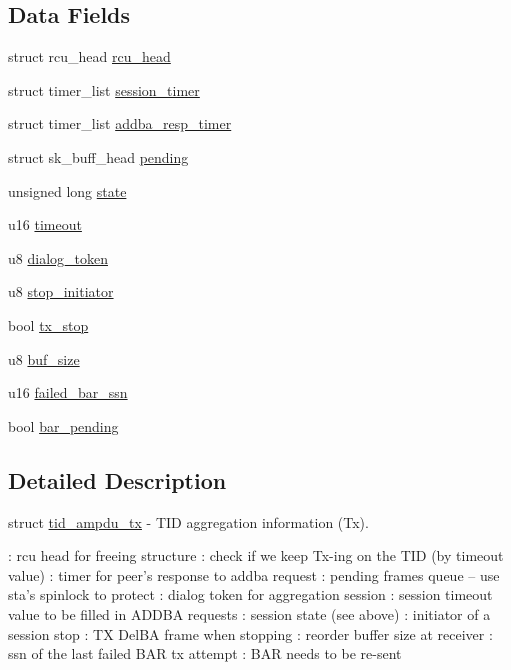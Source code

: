 \subsection*{Data Fields}
\begin{DoxyCompactItemize}
\item 
struct rcu\-\_\-head \hyperlink{structtid__ampdu__tx_ab698383409a24791490f962fe6990655}{rcu\-\_\-head}
\item 
struct timer\-\_\-list \hyperlink{structtid__ampdu__tx_a96b57b74220e5b5898ffd791809d9dfe}{session\-\_\-timer}
\item 
struct timer\-\_\-list \hyperlink{structtid__ampdu__tx_a6da3a9ab680a571b267e51fcca5a3178}{addba\-\_\-resp\-\_\-timer}
\item 
struct sk\-\_\-buff\-\_\-head \hyperlink{structtid__ampdu__tx_a6ef603b2ebc14267cfde5baf9f89b481}{pending}
\item 
unsigned long \hyperlink{structtid__ampdu__tx_af7504fc0e249186b115eb5f51a297878}{state}
\item 
u16 \hyperlink{structtid__ampdu__tx_a735bf6536b07682f96c9417b0f1e9079}{timeout}
\item 
u8 \hyperlink{structtid__ampdu__tx_a6ad691d9e8c744adc654ff53c98502d2}{dialog\-\_\-token}
\item 
u8 \hyperlink{structtid__ampdu__tx_a51e1b73c63d487e74b3c38bf47bc4d28}{stop\-\_\-initiator}
\item 
bool \hyperlink{structtid__ampdu__tx_a71f0a6678e6562dafeeb34a9d175f22f}{tx\-\_\-stop}
\item 
u8 \hyperlink{structtid__ampdu__tx_a9200bc5c3d0f32dca7213a89a0f76490}{buf\-\_\-size}
\item 
u16 \hyperlink{structtid__ampdu__tx_aeb33a4d1276de906633e672dbec23ba3}{failed\-\_\-bar\-\_\-ssn}
\item 
bool \hyperlink{structtid__ampdu__tx_a3d19fd08f014fe245dddaba7bc411ad0}{bar\-\_\-pending}
\end{DoxyCompactItemize}


\subsection{Detailed Description}
struct \hyperlink{structtid__ampdu__tx}{tid\-\_\-ampdu\-\_\-tx} -\/ T\-I\-D aggregation information (Tx).

\-: rcu head for freeing structure \-: check if we keep Tx-\/ing on the T\-I\-D (by timeout value) \-: timer for peer's response to addba request \-: pending frames queue -- use sta's spinlock to protect \-: dialog token for aggregation session \-: session timeout value to be filled in A\-D\-D\-B\-A requests \-: session state (see above) \-: initiator of a session stop \-: T\-X Del\-B\-A frame when stopping \-: reorder buffer size at receiver \-: ssn of the last failed B\-A\-R tx attempt \-: B\-A\-R needs to be re-\/sent

